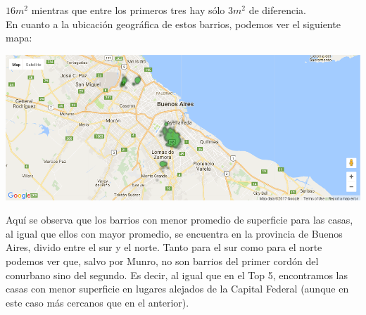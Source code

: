 \documentclass[a4paper, 10pt]{article}
\newcommand\tab[1][0.5cm]{\hspace*{#1}}
\begin{document}
            $16m^2$ mientras que entre los primeros tres hay sólo $3m^2$ de diferencia. \\
            \tab En cuanto a la ubicación geográfica de estos barrios, podemos ver el siguiente mapa:
            \begin{center}
                  \includegraphics[width=\textwidth]{images/houseSurfaceBottomMap}
            \end{center}
            \tab Aquí se observa que los barrios con menor promedio de superficie para las casas, al igual que ellos con
            mayor promedio, se encuentra en la provincia de Buenos Aires, divido entre el sur y el norte. Tanto para el
            sur como para el norte podemos ver que, salvo por Munro, no son barrios del primer cordón del conurbano sino
            del segundo. Es decir, al igual que en el Top 5, encontramos las casas con menor superficie en lugares alejados
            de la Capital Federal (aunque en este caso más cercanos que en el anterior).
\end{document}

